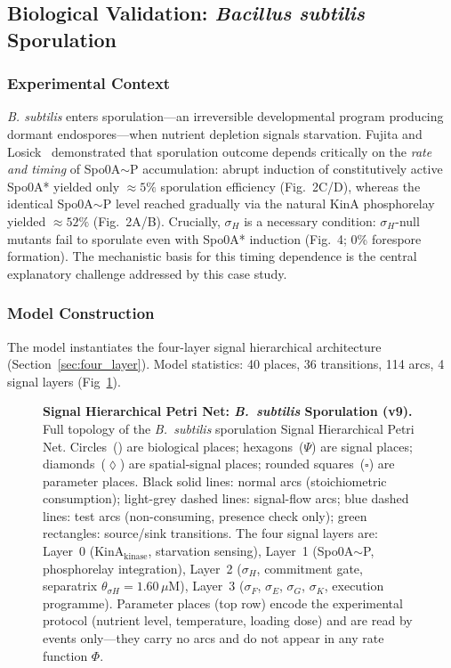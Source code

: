 \documentclass[10pt,letterpaper]{article}
\begin{document}
\subsection{Biological Validation: \textit{Bacillus subtilis} Sporulation}

\subsubsection{Experimental Context}

\textit{B. subtilis} enters sporulation---an irreversible developmental program producing dormant endospores---when nutrient depletion signals starvation. Fujita and Losick~\cite{fujita2005} demonstrated that sporulation outcome depends critically on the \emph{rate and timing} of Spo0A$\sim$P accumulation: abrupt induction of constitutively active Spo0A* yielded only $\approx 5\%$ sporulation efficiency (Fig.~2C/D), whereas the identical Spo0A$\sim$P level reached gradually via the natural KinA phosphorelay yielded $\approx 52\%$ (Fig.~2A/B). Crucially, $\sigma_H$ is a necessary condition: $\sigma_H$-null mutants fail to sporulate even with Spo0A* induction (Fig.~4; 0\% forespore formation). The mechanistic basis for this timing dependence is the central explanatory challenge addressed by this case study.

\subsubsection{Model Construction}

The model instantiates the four-layer signal hierarchical architecture (Section~\ref{sec:four_layer}). Model statistics: 40 places, 36 transitions, 114 arcs, 4 signal layers (Fig~\ref{fig:model_topology}).

\begin{figure}[!h]
    \caption{%
        \textbf{Signal Hierarchical Petri Net: \textit{B.~subtilis} Sporulation (v9).}
        Full topology of the \textit{B.~subtilis} sporulation Signal Hierarchical Petri Net.
        Circles~(\textbullet) are biological places; hexagons~($\Psi$) are signal places;
        diamonds~($\lozenge$) are spatial-signal places; rounded squares~($\square$) are
        parameter places.
        Black solid lines: normal arcs (stoichiometric consumption); light-grey dashed lines:
        signal-flow arcs; blue dashed lines: test arcs (non-consuming, presence check only);
        green rectangles: source/sink transitions.
        The four signal layers are: Layer~0 (KinA$_{\text{kinase}}$, starvation sensing),
        Layer~1 (Spo0A$\sim$P, phosphorelay integration),
        Layer~2 ($\sigma_H$, commitment gate, separatrix $\theta_{\sigma H} = 1.60\,\mu$M),
        Layer~3 ($\sigma_F$, $\sigma_E$, $\sigma_G$, $\sigma_K$, execution programme).
        Parameter places (top row) encode the experimental protocol (nutrient level, temperature,
        loading dose) and are read by events only---they carry no arcs and do not appear
        in any rate function $\Phi$.%
    }
    \label{fig:model_topology}
\end{figure}
\end{document}
